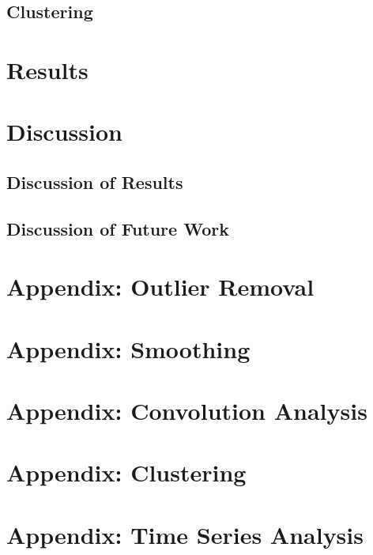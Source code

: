 \documentclass[11pt]{article}
\begin{document}
	\subsection{Clustering}
	
		
		
\section{Results} \label{results}
		
	

\section{Discussion} \label{discussion}
	
	\subsection{Discussion of Results}
		
		
		
	\subsection{Discussion of Future Work}
	
		
		


\appendix

\section{Appendix: Outlier Removal} \label{app_outliers}



\section{Appendix: Smoothing} \label{app_smoothing}



\section{Appendix: Convolution Analysis} \label{app_convolution}



\section{Appendix: Clustering} \label{app_clustering}



\section{Appendix: Time Series Analysis} \label{app_time}




\end{document}
